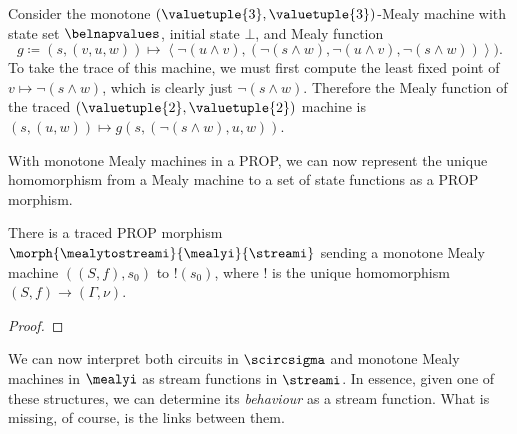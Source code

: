 \begin{example}\label{ex:trace-mealy}
    Consider the monotone \((\valuetuple{3},\valuetuple{3})\)-Mealy machine with
    state set \(\belnapvalues\), initial state \(\bot\), and Mealy function \[
        g \coloneqq (s, (v, u, w))
        \mapsto \left\langle
                \neg(u \land v),
                (\neg(s \land w), \neg(u \land v), \neg(s \land w))
        \right\rangle
    ).\]
    To take the trace of this machine, we must first compute the least fixed
    point of \(v \mapsto \neg(s \land w)\), which is clearly just
    \(\neg(s \land w)\).
    Therefore the Mealy function of the traced
    \((\valuetuple{2}, \valuetuple{2})\) machine is \(
        (s, (u, w)) \mapsto g(s, (\neg(s \land w), u, w))
    \).
\end{example}

With monotone Mealy machines in a PROP, we can now represent the unique
homomorphism from a Mealy machine to a set of state functions as a PROP
morphism.

\begin{proposition}
    There is a traced PROP morphism
    \(\morph{\mealytostreami}{\mealyi}{\streami}\) sending a monotone Mealy
    machine \(\left((S, f), s_0\right)\) to \(!(s_0)\), where \(!\) is the
    unique homomorphism \((S,f) \to (\Gamma,\nu)\).
\end{proposition}
\begin{proof}
\end{proof}


We can now interpret both circuits in \(\scircsigma\) and monotone Mealy
machines in \(\mealyi\) as stream functions in \(\streami\).
In essence, given one of these structures, we can determine its \emph{behaviour}
as a stream function.
What is missing, of course, is the links between them.
